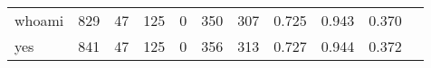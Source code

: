 \begin{longtable}{lp{1.10cm}p{1.10cm}p{1.10cm}p{1.10cm}p{1.10cm}p{1.10cm}p{1.10cm}p{1.10cm}p{1.10cm}p{1.10cm}}
whoami    &                    829 &                                 47 &                               125 &                                0 &                               350 &                             307 &                             0.725 &                                 0.943 &                               0.370 \\
yes       &                    841 &                                 47 &                               125 &                                0 &                               356 &                             313 &                             0.727 &                                 0.944 &                               0.372 \\
\end{longtable}

